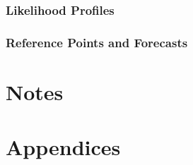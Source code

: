 \documentclass[
]{scrartcl}
\begin{document}
\subsubsection{Likelihood Profiles}\label{likelihood-profiles-1}

\subsubsection{Reference Points and
Forecasts}\label{reference-points-and-forecasts}

\newpage{}

\section{Notes}\label{notes}

\newpage{}

\section*{Appendices}\label{sec-appendix}
\end{document}
